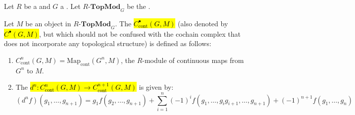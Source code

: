 \begin{definition} \label{definition:continuous_cochain_complex_of_a_topological_module_over_a_group_ring_of_a_topological_group_over_a_topological_ring}
Let $R$ be a  and $G$ a . Let $R\text{-}\mathbf{TopMod}_G$ be the .

Let $M$ be an object in $R\text{-}\mathbf{TopMod}_G$. The  \hl{$C^\bullet_{\text{cont}}(G, M)$} (also denoted by \hl{$C^\bullet(G,M)$}, but which should not be confused with the cochain complex  that does not incorporate any topological structure) is defined as follows:
\begin{enumerate}
    \item $C^n_{\text{cont}}(G, M) = \text{Map}_{\text{cont}}(G^n, M)$, the $R$-module of continuous maps from $G^n$ to $M$.
    \item The  \hl{$d^n: C^n_{\text{cont}}(G, M) \to C^{n+1}_{\text{cont}}(G, M)$} is given by:
    $$(d^n f)(g_1, \dots, g_{n+1}) = g_1 f(g_2, \dots, g_{n+1}) + \sum_{i=1}^n (-1)^i f(g_1, \dots, g_i g_{i+1}, \dots, g_{n+1}) + (-1)^{n+1} f(g_1, \dots, g_n)$$
\end{enumerate}
\end{definition}